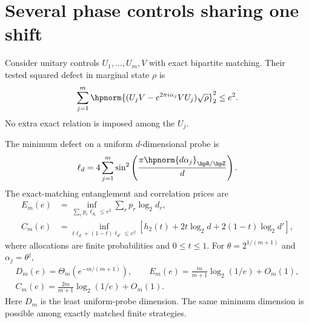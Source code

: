 \section{Several phase controls sharing one shift}\label{hp:app:multi}
Consider unitary controls $U_1,\ldots,U_m,V$ with exact bipartite matching. Their tested squared defect in marginal state $\rho$ is
\[
 \sum_{j=1}^m\hpnorm{(U_jV-e^{2\pi i\alpha_j}VU_j)\sqrt\rho}_2^2\le e^2.
\]
No extra exact relation is imposed among the $U_j$.

\begin{theorem}\label{hp:thm:multi}
The minimum defect on a uniform $d$-dimensional probe is
\begin{equation}
 \ell_d=4\sum_{j=1}^m\sin^2\left(\frac{\pi\hpnorm{d\alpha_j}_{\hpR/\hpZ}}d\right).\label{hp:eq:ell}
\end{equation}
The exact-matching entanglement and correlation prices are
\begin{align}
 E_m(e)&=\inf_{\sum_rp_r\ell_{d_r}\le e^2}\sum_rp_r\log_2d_r,\label{hp:eq:multiED}\\
 C_m(e)&=\inf_{t\ell_d+(1-t)\ell_{d'}\le e^2}
     [h_2(t)+2t\log_2d+2(1-t)\log_2d'],\label{hp:eq:multiMI}
\end{align}
where allocations are finite probabilities and $0\le t\le1$. For $\theta=2^{1/(m+1)}$ and $\alpha_j=\theta^j$,
\begin{gather}
 D_m(e)=\Theta_m(e^{-m/(m+1)}),\qquad
 E_m(e)=\frac m{m+1}\log_2(1/e)+O_m(1),\\
 C_m(e)=\frac{2m}{m+1}\log_2(1/e)+O_m(1).
\end{gather}
Here $D_m$ is the least uniform-probe dimension. The same minimum dimension is possible among exactly matched finite strategies.
\end{theorem}
